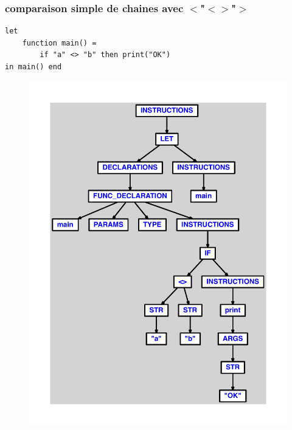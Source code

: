 \documentclass{article}
\begin{document}
\subsubsection{comparaison simple de chaines avec $ < $"$ < $$ > $"$ > $}
\begin{lstlisting}
let
	function main() =
		if "a" <> "b" then print("OK")
in main() end
\end{lstlisting}
\newpage
\begin{figure}[H]
\centering
\includegraphics[max width=\textwidth]{ast/ast_180.pdf}
\end{figure}
\newpage
\end{document}
